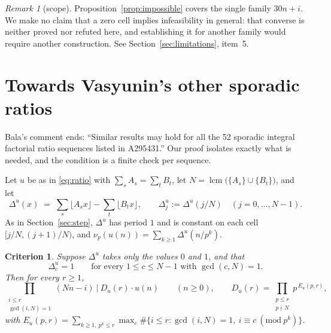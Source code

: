 \documentclass[11pt]{article}
\theoremstyle{plain}
\newtheorem{criterion}[theorem]{Criterion}
\theoremstyle{definition}
\theoremstyle{remark}
\newtheorem*{remark}{Remark}
\numberwithin{equation}{section}
\DeclareMathOperator{\lcm}{lcm}
\begin{document}
\begin{remark}[scope]
Proposition~\ref{prop:impossible} covers the single family $30n+i$. We make no claim that a zero
cell implies infeasibility in general: that converse is neither proved nor refuted here, and
establishing it for another family would require another construction. See
Section~\ref{sec:limitations}, item~5.
\end{remark}

\section{Towards Vasyunin's other sporadic ratios}
\label{sec:sporadic}

Bala's comment ends: ``Similar results may hold for all the 52 sporadic integral factorial ratio
sequences listed in A295431.'' Our proof isolates exactly what is needed, and the condition is a
finite check per sequence.

Let $u$ be as in \eqref{eq:ratio} with $\sum_s A_s = \sum_t B_t$, let
$N = \lcm\bigl(\{A_s\}\cup\{B_t\}\bigr)$, and let
\[
  \Delta^u(x) \;=\; \sum_{s}\lfloor A_s x\rfloor - \sum_t \lfloor B_t x\rfloor ,
  \qquad \Delta^u_j := \Delta^u(j/N) \quad (j=0,\dots,N-1).
\]
As in Section~\ref{sec:step}, $\Delta^u$ has period $1$ and is constant on each cell
$[j/N,(j+1)/N)$, and $\nu_p(u(n)) = \sum_{k\ge1}\Delta^u(n/p^k)$.

\begin{criterion}
\label{crit:general}
Suppose $\Delta^u$ takes only the values $0$ and $1$, and that
\[
  \Delta^u_c = 1 \qquad\text{for every } 1 \le c \le N-1 \text{ with } \gcd(c,N)=1 .
\]
Then for every $r \ge 1$,
\[
  \prod_{\substack{i \le r\\ \gcd(i,N)=1}} (Nn-i) \ \Big|\ D_u(r)\cdot u(n)
  \qquad (n \ge 0),
  \qquad
  D_u(r) = \prod_{\substack{p \le r\\ p \nmid N}} p^{\,E_u(p,r)},
\]
with $E_u(p,r) = \sum_{k \ge 1,\ p^k \le r}\max_{c}\#\{i \le r : \gcd(i,N)=1,\ i \equiv c\
(\mathrm{mod}\ p^k)\}$.
\end{criterion}
\end{document}
